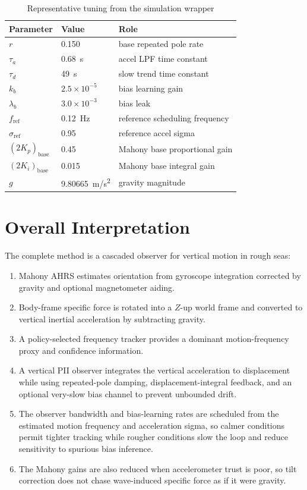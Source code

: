 \documentclass[conference]{IEEEtran}
\begin{document}
\begin{table}[t]
  \centering
  \caption{Representative tuning from the simulation wrapper}
  \label{tab:tuning}
  \small
  \begin{tabular}{@{}lll@{}}
    \toprule
    Parameter & Value & Role \\
    \midrule
    \(r\) & 0.150 & base repeated pole rate \\
    \(\tau_a\) & \SI{0.68}{s} & accel LPF time constant \\
    \(\tau_d\) & \SI{49}{s} & slow trend time constant \\
    \(k_b\) & \(2.5\times10^{-5}\) & bias learning gain \\
    \(\lambda_b\) & \(3.0\times10^{-3}\) & bias leak \\
    \(f_{\mathrm{ref}}\) & \SI{0.12}{Hz} & reference scheduling frequency \\
    \(\sigma_{\mathrm{ref}}\) & 0.95 & reference accel sigma \\
    \((2K_p)_{\mathrm{base}}\) & 0.45 & Mahony base proportional gain \\
    \((2K_i)_{\mathrm{base}}\) & 0.015 & Mahony base integral gain \\
    \(g\) & \SI{9.80665}{m/s^2} & gravity magnitude \\
    \bottomrule
  \end{tabular}
\end{table}

\section{Overall Interpretation}

The complete method is a cascaded observer for vertical motion in rough seas:
\begin{enumerate}[leftmargin=1.5em]
\item Mahony AHRS estimates orientation from gyroscope integration corrected by
      gravity and optional magnetometer aiding.
\item Body-frame specific force is rotated into a \(Z\)-up world frame and
      converted to vertical inertial acceleration by subtracting gravity.
\item A policy-selected frequency tracker provides a dominant motion-frequency
      proxy and confidence information.
\item A vertical PII observer integrates the vertical acceleration to
      displacement while using repeated-pole damping, displacement-integral
      feedback, and an optional very-slow bias channel to prevent unbounded
      drift.
\item The observer bandwidth and bias-learning rates are scheduled from the
      estimated motion frequency and acceleration sigma, so calmer conditions
      permit tighter tracking while rougher conditions slow the loop and reduce
      sensitivity to spurious bias inference.
\item The Mahony gains are also reduced when accelerometer trust is poor, so
      tilt correction does not chase wave-induced specific force as if it were
      gravity.
\end{enumerate}
\end{document}
